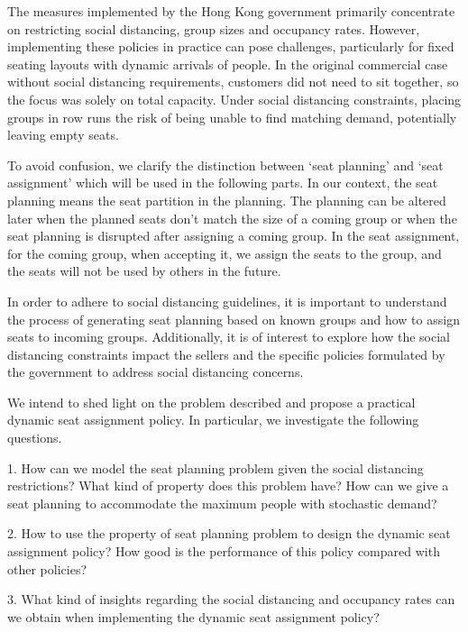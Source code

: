 The measures implemented by the Hong Kong government primarily concentrate on restricting social distancing, group sizes and occupancy rates. However, implementing these policies in practice can pose challenges, particularly for fixed seating layouts with dynamic arrivals of people. In the original commercial case without social distancing requirements, customers did not need to sit together, so the focus was solely on total capacity. Under social distancing constraints, placing groups in row runs the risk of being unable to find matching demand, potentially leaving empty seats.

To avoid confusion, we clarify the distinction between `seat planning' and `seat assignment' which will be used in the following parts. In our context, the seat planning means the seat partition in the planning. The planning can be altered later when the planned seats don't match the size of a coming group or when the seat planning is disrupted after assigning a coming group. In the seat assignment, for the coming group, when accepting it, we assign the seats to the group, and the seats will not be used by others in the future.

In order to adhere to social distancing guidelines, it is important to understand the process of generating seat planning based on known groups and how to assign seats to incoming groups. Additionally, it is of interest to explore how the social distancing constraints impact the sellers and the specific policies formulated by the government to address social distancing concerns.

We intend to shed light on the problem described and propose a practical dynamic seat assignment policy. In particular, we investigate the following questions. 

1. How can we model the seat planning problem given the social distancing restrictions? What kind of property does this problem have? How can we give a seat planning to accommodate the maximum people with stochastic demand?

2. How to use the property of seat planning problem to design the dynamic seat assignment policy? How good is the performance of this policy compared with other policies?

3. What kind of insights regarding the social distancing and occupancy rates can we obtain when implementing the dynamic seat assignment policy?


